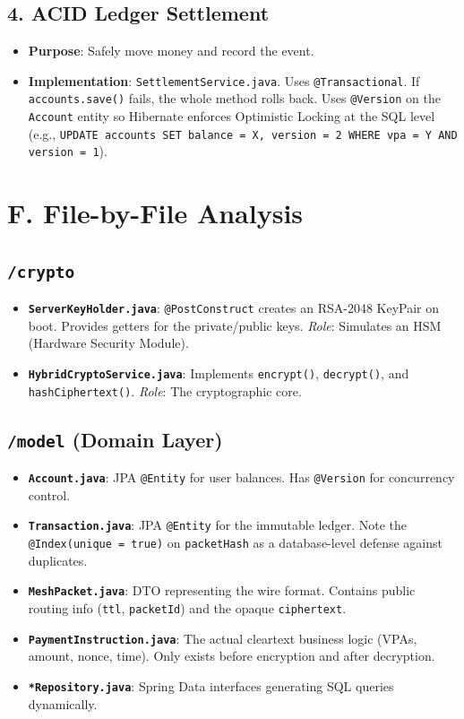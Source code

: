 \documentclass[11pt, a4paper]{article}
\begin{document}
\subsection*{4. ACID Ledger Settlement}
\begin{itemize}
    \item \textbf{Purpose}: Safely move money and record the event.
    \item \textbf{Implementation}: \texttt{SettlementService.java}. Uses \texttt{@Transactional}. If \texttt{accounts.save()} fails, the whole method rolls back. Uses \texttt{@Version} on the \texttt{Account} entity so Hibernate enforces Optimistic Locking at the SQL level (e.g., \texttt{UPDATE accounts SET balance = X, version = 2 WHERE vpa = Y AND version = 1}).
\end{itemize}

\section*{F. File-by-File Analysis}

\subsection*{\texttt{/crypto}}
\begin{itemize}
    \item \textbf{\texttt{ServerKeyHolder.java}}: \texttt{@PostConstruct} creates an RSA-2048 KeyPair on boot. Provides getters for the private/public keys. \textit{Role}: Simulates an HSM (Hardware Security Module).
    \item \textbf{\texttt{HybridCryptoService.java}}: Implements \texttt{encrypt()}, \texttt{decrypt()}, and \texttt{hashCiphertext()}. \textit{Role}: The cryptographic core.
\end{itemize}

\subsection*{\texttt{/model} (Domain Layer)}
\begin{itemize}
    \item \textbf{\texttt{Account.java}}: JPA \texttt{@Entity} for user balances. Has \texttt{@Version} for concurrency control.
    \item \textbf{\texttt{Transaction.java}}: JPA \texttt{@Entity} for the immutable ledger. Note the \texttt{@Index(unique = true)} on \texttt{packetHash} as a database-level defense against duplicates.
    \item \textbf{\texttt{MeshPacket.java}}: DTO representing the wire format. Contains public routing info (\texttt{ttl}, \texttt{packetId}) and the opaque \texttt{ciphertext}.
    \item \textbf{\texttt{PaymentInstruction.java}}: The actual cleartext business logic (VPAs, amount, nonce, time). Only exists before encryption and after decryption.
    \item \textbf{\texttt{*Repository.java}}: Spring Data interfaces generating SQL queries dynamically.
\end{itemize}
\end{document}
